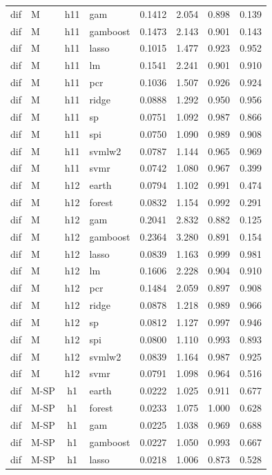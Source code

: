 \begin{ThreePartTable}
\begin{longtable}[t]{llclcccc}
dif & M & h11 & gam & 0.1412 & 2.054 & 0.898 & 0.139\\
dif & M & h11 & gamboost & 0.1473 & 2.143 & 0.901 & 0.143\\
dif & M & h11 & lasso & 0.1015 & 1.477 & 0.923 & 0.952\\
dif & M & h11 & lm & 0.1541 & 2.241 & 0.901 & 0.910\\
dif & M & h11 & pcr & 0.1036 & 1.507 & 0.926 & 0.924\\
dif & M & h11 & ridge & 0.0888 & 1.292 & 0.950 & 0.956\\
dif & M & h11 & sp & 0.0751 & 1.092 & 0.987 & 0.866\\
dif & M & h11 & spi & 0.0750 & 1.090 & 0.989 & 0.908\\
dif & M & h11 & svmlw2 & 0.0787 & 1.144 & 0.965 & 0.969\\
dif & M & h11 & svmr & 0.0742 & 1.080 & 0.967 & 0.399\\
\addlinespace
dif & M & h12 & earth & 0.0794 & 1.102 & 0.991 & 0.474\\
dif & M & h12 & forest & 0.0832 & 1.154 & 0.992 & 0.291\\
dif & M & h12 & gam & 0.2041 & 2.832 & 0.882 & 0.125\\
dif & M & h12 & gamboost & 0.2364 & 3.280 & 0.891 & 0.154\\
dif & M & h12 & lasso & 0.0839 & 1.163 & 0.999 & 0.981\\
dif & M & h12 & lm & 0.1606 & 2.228 & 0.904 & 0.910\\
dif & M & h12 & pcr & 0.1484 & 2.059 & 0.897 & 0.908\\
dif & M & h12 & ridge & 0.0878 & 1.218 & 0.989 & 0.966\\
dif & M & h12 & sp & 0.0812 & 1.127 & 0.997 & 0.946\\
dif & M & h12 & spi & 0.0800 & 1.110 & 0.993 & 0.893\\
dif & M & h12 & svmlw2 & 0.0839 & 1.164 & 0.987 & 0.925\\
dif & M & h12 & svmr & 0.0791 & 1.098 & 0.964 & 0.516\\
\addlinespace
dif & M-SP & h1 & earth & 0.0222 & 1.025 & 0.911 & 0.677\\
dif & M-SP & h1 & forest & 0.0233 & 1.075 & 1.000 & 0.628\\
dif & M-SP & h1 & gam & 0.0225 & 1.038 & 0.969 & 0.688\\
dif & M-SP & h1 & gamboost & 0.0227 & 1.050 & 0.993 & 0.667\\
dif & M-SP & h1 & lasso & 0.0218 & 1.006 & 0.873 & 0.528\\

\end{longtable}
\end{ThreePartTable}
